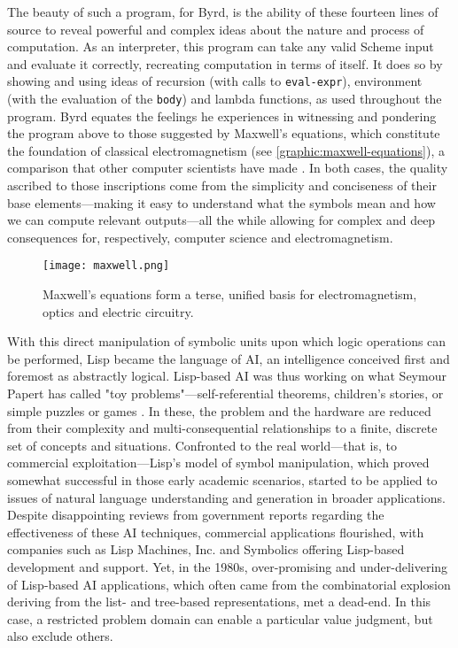 The beauty of such a program, for Byrd, is the ability of these fourteen lines of source to reveal powerful and complex ideas about the nature and process of computation. As an interpreter, this program can take any valid Scheme input and evaluate it correctly, recreating computation in terms of itself. It does so by showing and using ideas of recursion (with calls to \lstinline{eval-expr}), environment (with the evaluation of the \lstinline{body}) and lambda functions, as used throughout the program. Byrd equates the feelings he experiences in witnessing and pondering the program above to those suggested by Maxwell's equations, which constitute the foundation of classical electromagnetism (see \autoref{graphic:maxwell-equations}), a comparison that other computer scientists have made \citep{kay_conversation_2004}. In both cases, the quality ascribed to those inscriptions come from the simplicity and conciseness of their base elements—making it easy to understand what the symbols mean and how we can compute relevant outputs—all the while allowing for complex and deep  consequences for, respectively, computer science and electromagnetism.

\begin{figure}
  \texttt{[image: maxwell.png]}
  \caption{Maxwell's equations form a terse, unified basis for electromagnetism, optics and electric circuitry.}
  \label{graphic:maxwell-equations}
\end{figure}

With this direct manipulation of symbolic units upon which logic operations can be performed, Lisp became the language of AI, an intelligence conceived first and foremost as abstractly logical. Lisp-based AI was thus working on what Seymour Papert has called "toy problems"—self-referential theorems, children's stories, or simple puzzles or games \citep{nilsson_early_2009}. In these, the problem and the hardware are reduced from their complexity and multi-consequential relationships to a finite, discrete set of concepts and situations. Confronted to the real world—that is, to commercial exploitation—Lisp's model of symbol manipulation, which proved somewhat successful in those early academic scenarios, started to be applied to issues of natural language understanding and generation in broader applications. Despite disappointing reviews from government reports regarding the effectiveness of these AI techniques, commercial applications flourished, with companies such as Lisp Machines, Inc. and Symbolics offering Lisp-based development and support. Yet, in the 1980s, over-promising and under-delivering of Lisp-based AI applications, which often came from the combinatorial explosion deriving from the list- and tree-based representations, met a dead-end. In this case, a restricted problem domain can enable a particular value judgment, but also exclude others.

